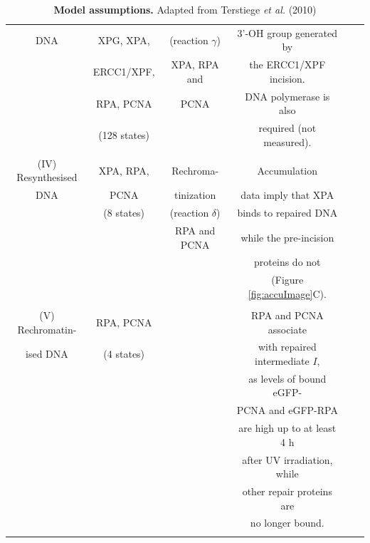 \begin{table}[t!]
{\begin{tabular}{cccccc}
			DNA& XPG, XPA,& (reaction $\gamma$)&3'-OH group generated by&\cite{Winkler2001}\\
			& ERCC1/XPF,&XPA, RPA and&  the ERCC1/XPF incision.&\\
			&RPA, PCNA& PCNA& DNA polymerase is also&\\
			&(128 states)&& required (not measured).	&\\
			&&&& \\   \hline
			\rule{0pt}{3ex}
			(IV) Resynthesised&XPA, RPA,&Rechroma-&Accumulation&\cite{Moser2005}\\
			DNA&	 PCNA& tinization& data imply that XPA&  \cite{Shivji:1995:Biochemistry:7711023}\\
			&(8 states)&(reaction $\delta$)& binds  to repaired DNA &\cite{Luijsterburg2010}\\
			&&RPA and PCNA&while the pre-incision &\\
			&&&	  proteins do not &\\
			&&& (Figure \ref{fig:accuImage}C).&\\
			&&&& \\ \hline
			\rule{0pt}{3ex}
			(V) Rechromatin- &RPA, PCNA &&RPA and PCNA associate&\cite{Riedl2003}\\
			ised DNA &(4 states)	&&with repaired intermediate $I$,&\cite{Luijsterburg2010}\\
			&&&as levels of bound eGFP-&\\
			&&&PCNA and eGFP-RPA&\\ 
			&&& are  high up to at least 4 h&\\
			&&& after UV irradiation, while&\\
			&&& other repair proteins are&\\   
			&&& no longer bound.&\\   &&&& \\ \hline
		\end{tabular}}
		\caption{\textbf{Model assumptions.} Adapted from Terstiege \textit{et al.} (2010) \cite{Terstiege2010}}\label{tab:modelassumptions}
	\end{table}
	\newpage
	\cleardoublepage  
	 
